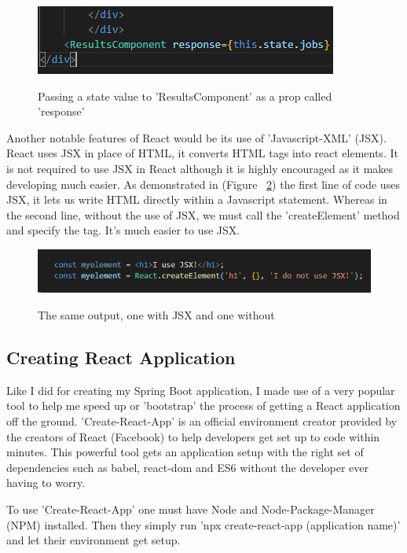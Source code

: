 \begin{figure}[h]
    \centering
    \includegraphics[scale=0.8]{Images/react1.png} 
    \label{react1_label}
    \caption{Passing a state value to 'ResultsComponent' as a prop called 'response'}
\end{figure}

Another notable features of React would be its use of 'Javascript-XML' (JSX). React uses JSX in place of HTML, it converts HTML tags into react elements. It is not required to use JSX in React although it is highly encouraged as it makes developing much easier. As demonstrated in (Figure ~\ref{react2_label}) the first line of code uses JSX, it lets us write HTML directly within a Javascript statement. Whereas in the second line, without the use of JSX, we must call the 'createElement' method and specify the tag. It's much easier to use JSX.

\begin{figure}[ht]
    \centering
    \includegraphics[scale=0.7]{Images/react2.png} 
    \label{react2_label}
    \caption{The same output, one with JSX and one without}
\end{figure}

\subsection{Creating React Application}
Like I did for creating my Spring Boot application, I made use of a very popular tool to help me speed up or 'bootstrap' the process of getting a React application off the ground. 'Create-React-App' is an official environment creator provided by the creators of React (Facebook) to help developers get set up to code within minutes. This powerful tool gets an application setup with the right set of dependencies such as babel, react-dom and ES6 without the developer ever having to worry.

To use 'Create-React-App' one must have Node and Node-Package-Manager (NPM) installed. Then they simply run 'npx create-react-app (application name)' and let their environment get setup.

